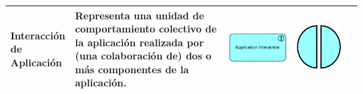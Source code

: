 {\begin{longtable}{|p{0.15\linewidth}|p{0.45\linewidth}|p{0.2\linewidth} p{0.2\linewidth}|}
    	Interacción de Aplicación 
    	&
    	Representa una unidad de comportamiento colectivo de la aplicación realizada por (una colaboración de) dos o más componentes de la aplicación. 
    	&
    	\begin{center}
    		\includegraphics[width=1\linewidth]{imgs/Aplication_interaction.pdf}
    	\end{center} &
    	\begin{center}
    		\includegraphics[width=0.7\linewidth]{imgs/interaction.pdf}
    	\end{center}
    	\\ \hline
    	

\end{longtable}}
